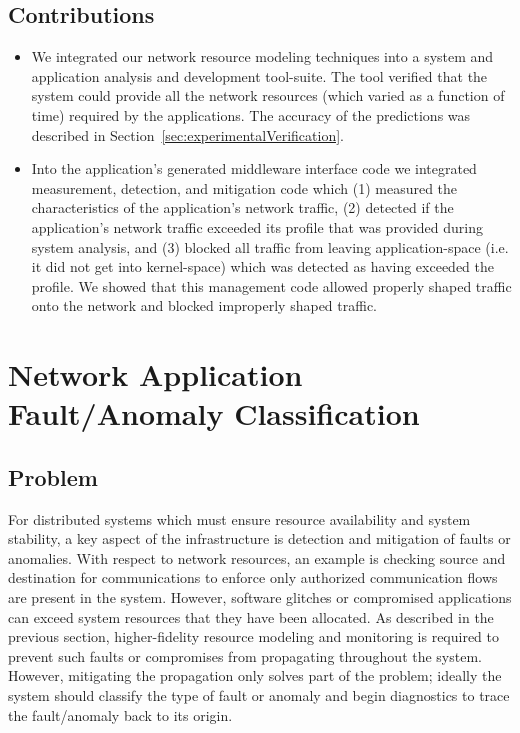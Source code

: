 \subsection{Contributions}
\begin{itemize}
	\item We integrated our network resource modeling techniques into a system and application analysis and development tool-suite. The tool verified that the system could provide all the network resources (which varied as a function of time) required by the applications.  The accuracy of the predictions was described in Section~\ref{sec:experimentalVerification}. 
	\item Into the application's generated middleware interface code we integrated measurement, detection, and mitigation code which (1) measured the characteristics of the application's network traffic, (2) detected if the application's network traffic exceeded its profile that was provided during system analysis, and (3) blocked all traffic from leaving application-space (i.e. it did not get into kernel-space) which was detected as having exceeded the profile.  We showed that this management code allowed properly shaped traffic onto the network and blocked improperly shaped traffic.
\end{itemize}

\newpage
\section{Network Application Fault/Anomaly Classification}
\label{sec:classification}

\subsection{Problem}
For distributed systems which must ensure resource availability and system stability, a key aspect of the infrastructure is detection and mitigation of faults or anomalies.  With respect to network resources, an example is checking source and destination for communications to enforce only authorized communication flows are present in the system.  However, software glitches or compromised applications can exceed system resources that they have been allocated.  As described in the previous section, higher-fidelity resource modeling and monitoring is required to prevent such faults or compromises from propagating throughout the system.  However, mitigating the propagation only solves part of the problem; ideally the system should classify the type of fault or anomaly and begin diagnostics to trace the fault/anomaly back to its origin.  

